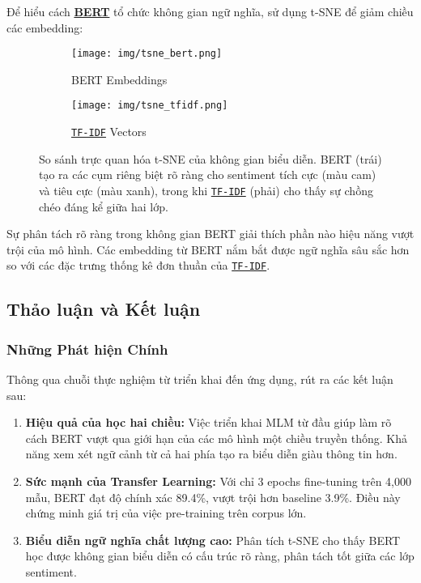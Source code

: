 Để hiểu cách \hyperref[acro:bert]{\textbf{BERT}} tổ chức không gian ngữ nghĩa, sử dụng t-SNE \cite{vandermaaten2008visualizing} để giảm chiều các embedding:

\begin{figure}[H]
    \centering
    \begin{subfigure}[b]{0.49\textwidth}
        \centering
        \texttt{[image: img/tsne\_bert.png]}
        \caption{BERT Embeddings}
        \label{fig:tsne_bert_sub}
    \end{subfigure}
    \hfill
    \begin{subfigure}[b]{0.49\textwidth}
        \centering
        \texttt{[image: img/tsne\_tfidf.png]}
        \caption{\hyperref[acro:tfidf]{\texttt{TF-IDF}} Vectors}
        \label{fig:tsne_tfidf_sub}
    \end{subfigure}
    \caption{So sánh trực quan hóa t-SNE của không gian biểu diễn. BERT (trái) tạo ra các cụm riêng biệt rõ ràng cho sentiment tích cực (màu cam) và tiêu cực (màu xanh), trong khi \hyperref[acro:tfidf]{\texttt{TF-IDF}} (phải) cho thấy sự chồng chéo đáng kể giữa hai lớp.}
    \label{fig:tsne_comparison_detailed}
\end{figure}

Sự phân tách rõ ràng trong không gian BERT giải thích phần nào hiệu năng vượt trội của mô hình. Các embedding từ BERT nắm bắt được ngữ nghĩa sâu sắc hơn so với các đặc trưng thống kê đơn thuần của \hyperref[acro:tfidf]{\texttt{TF-IDF}}.

\subsection{Thảo luận và Kết luận}
\label{ssec:thao_luan_ket_luan}

\subsubsection{Những Phát hiện Chính}

Thông qua chuỗi thực nghiệm từ triển khai đến ứng dụng, rút ra các kết luận sau:

\begin{enumerate}
    \item \textbf{Hiệu quả của học hai chiều:} Việc triển khai MLM từ đầu giúp làm rõ cách BERT vượt qua giới hạn của các mô hình một chiều truyền thống. Khả năng xem xét ngữ cảnh từ cả hai phía tạo ra biểu diễn giàu thông tin hơn.
    
    \item \textbf{Sức mạnh của Transfer Learning:} Với chỉ 3 epochs fine-tuning trên 4,000 mẫu, BERT đạt độ chính xác 89.4\%, vượt trội hơn baseline 3.9\%. Điều này chứng minh giá trị của việc pre-training trên corpus lớn.
    
    \item \textbf{Biểu diễn ngữ nghĩa chất lượng cao:} Phân tích t-SNE cho thấy BERT học được không gian biểu diễn có cấu trúc rõ ràng, phân tách tốt giữa các lớp sentiment.
\end{enumerate}

